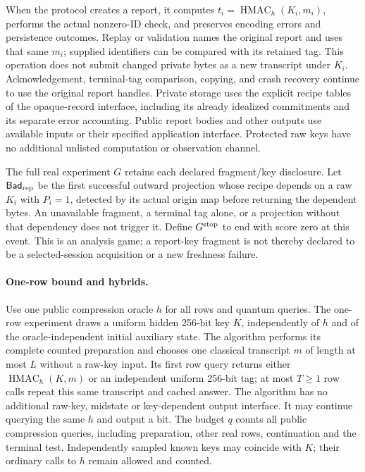 \documentclass[pdflatex]{sn-jnl}
\theoremstyle{thmstyleone}
\theoremstyle{thmstylethree}
\theoremstyle{thmstyletwo}
\begin{document}
When the protocol creates a report, it computes
$t_i=\operatorname{HMAC}_h(K_i,m_i)$, performs the actual nonzero-ID check,
and preserves encoding errors and persistence outcomes. Replay or validation names the
original report and uses that same $m_i$; supplied identifiers can be compared
with its retained tag.  This operation does not submit changed private bytes
as a new transcript under $K_i$.  Acknowledgement, terminal-tag comparison,
copying, and crash recovery continue to use the original report handles.
Private storage uses the explicit recipe tables of the opaque-record
interface, including its already idealized commitments and its separate error
accounting.  Public report bodies and other outputs use available inputs or
their specified application interface.  Protected raw keys have no additional
unlisted computation or observation channel.

The full real experiment $G$ retains each declared fragment/key disclosure.
Let $\mathsf{Bad}_{\rm rep}$ be the first successful outward projection whose
recipe depends on a raw $K_i$ with $P_i=1$, detected by its actual origin map
before returning the dependent bytes.  An unavailable fragment, a terminal
tag alone, or a projection without that dependency does not trigger it.
Define $G^{\rm stop}$ to end with score zero at this event.  This is an
analysis game; a report-key fragment is not thereby declared to be a
selected-session acquisition or a new freshness failure.

\paragraph{One-row bound and hybrids.}
Use one public compression oracle $h$ for all rows and quantum queries.
The one-row experiment draws a uniform hidden 256-bit key $K$, independently
of $h$ and of the oracle-independent initial auxiliary state. The algorithm performs
its complete counted preparation and chooses one classical transcript $m$ of
length at most $L$ without a raw-key input. Its first row query returns either
$\operatorname{HMAC}_h(K,m)$ or an independent uniform 256-bit tag; at most
$T\ge1$ row calls repeat this same transcript and cached answer. The algorithm
has no additional raw-key, midstate or key-dependent output interface.
It may continue querying the same $h$ and output a bit. The budget $q$ counts
all public compression queries, including preparation, other real rows,
continuation and the terminal test. Independently sampled known keys may
coincide with $K$; their ordinary calls to $h$ remain allowed and counted.
\end{document}
